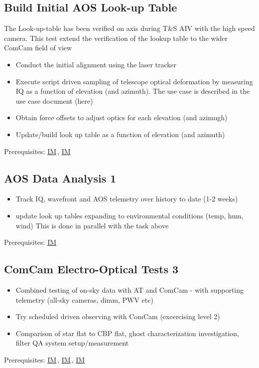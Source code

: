 \documentclass[SE,authoryear,toc]{lsstdoc}
\newcommand{\IM}[1]{\hyperref[IM:#1]{\color{blue}IM$_{\text{\csname nameIM#1\endcsname}}$}}
\begin{document}
\subsection{Build Initial AOS Look-up Table}

The Look-up-table has been verified on axis during T\&S AIV with the high speed camera. This test extend the verification of the lookup table to the wider ComCam field of view

\begin{itemize}
\item Conduct the initial alignment using the laser tracker
\item Execute script driven sampling of telescope optical deformation by measuring IQ as a function of elevation (and azimuth). The use case is described in the use case document (here)
\item Obtain force offsets to adjust optics for each elevation (and azimugh)
\item Update/build look up table as a function of elevation (and azimuth)
\end{itemize}
Prerequisites: \IM{b}, \IM{g}

\subsection{AOS Data Analysis 1}

\begin{itemize}
\item Track IQ, wavefront and AOS telemetry over history to date (1-2 weeks)
\item update look up tables expanding to environmental conditions (temp, hum, wind)
  This is done in parallel with the task above
\end{itemize}
Prerequisites: \IM{b}

\subsection{ComCam Electro-Optical Tests 3}

\begin{itemize}
\item Combined testing of on-sky data with AT and ComCam - with supporting telemetry (all-sky cameras, dimm, PWV etc)
\item Try scheduled driven observing with ComCam (excercising level 2)
\item Comparison of star flat to CBP flat, ghost characterization investigation, filter QA system setup/measurement
\end{itemize}
Prerequisites: \IM{b}, \IM{g}, \IM{cbp}
\end{document}
